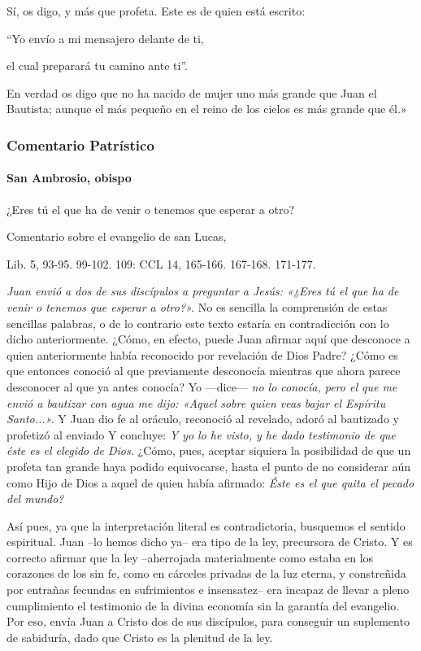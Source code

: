 \documentclass[]{article}
\let\oldparagraph\paragraph
\renewcommand{\paragraph}[1]{\oldparagraph{#1}\mbox{}}
\begin{document}
Sí, os digo, y más que profeta. Este es de quien está escrito:

``Yo envío a mi mensajero delante de ti,

el cual preparará tu camino ante ti''.

En verdad os digo que no ha nacido de mujer uno más grande que Juan el
Bautista; aunque el más pequeño en el reino de los cielos es más grande
que él.»

\protect\hypertarget{_Toc448662735}{}{}

\subsubsection{Comentario Patrístico}\label{comentario-patruxedstico-2}

\paragraph{San Ambrosio, obispo}\label{san-ambrosio-obispo}

¿Eres tú el que ha de venir o tenemos que esperar a otro?

Comentario sobre el evangelio de san Lucas,

Lib. 5, 93-95. 99-102. 109: CCL 14, 165-166. 167-168. 171-177.

\emph{Juan envió a dos de sus discípulos a preguntar a Jesús: «¿Eres tú
el que ha de venir o tenemos que esperar a otro?».} No es sencilla la
comprensión de estas sencillas palabras, o de lo contrario este texto
estaría en contradicción con lo dicho anteriormente. ¿Cómo, en efecto,
puede Juan afirmar aquí que desconoce a quien anteriormente había
reconocido por revelación de Dios Padre? ¿Cómo es que entonces conoció
al que previamente desconocía mientras que ahora parece desconocer al
que ya antes conocía? Yo ---dice--- \emph{no lo conocía, pero el que me
envió a bautizar con agua me dijo: «Aquel sobre quien veas bajar el
Espíritu Santo...».} Y Juan dio fe al oráculo, reconoció al revelado,
adoró al bautizado y profetizó al enviado Y concluye: \emph{Y yo lo he
visto, y he dado testimonio de que éste es el elegido de Dios.} ¿Cómo,
pues, aceptar siquiera la posibilidad de que un profeta tan grande haya
podido equivocarse, hasta el punto de no considerar aún como Hijo de
Dios a aquel de quien había afirmado: \emph{Éste es el que quita el
pecado del mundo?}

Así pues, ya que la interpretación literal es contradictoria, busquemos
el sentido espiritual. Juan --lo hemos dicho ya-- era tipo de la ley,
precursora de Cristo. Y es correcto afirmar que la ley --aherrojada
materialmente como estaba en los corazones de los sin fe, como en
cárceles privadas de la luz eterna, y constreñida por entrañas fecundas
en sufrimientos e insensatez-- era incapaz de llevar a pleno
cumplimiento el testimonio de la divina economía sin la garantía del
evangelio. Por eso, envía Juan a Cristo dos de sus discípulos, para
conseguir un suplemento de sabiduría, dado que Cristo es la plenitud de
la ley.
\end{document}
